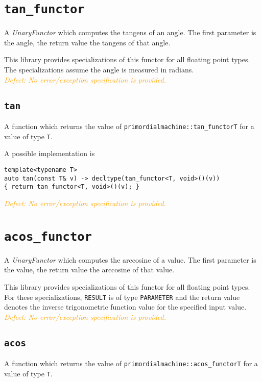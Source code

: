 \documentclass[oneside]{report}
\begin{document}
\section{\texttt{tan\_functor}}
A \textit{UnaryFunctor} which computes the
tangens
of an angle.
The first parameter is the angle, the return value the tangens of that angle.

\noindent{}This library provides specializations of this functor for all floating point types.
The specializations assume the angle is measured in radians.\\

\noindent{}\textcolor{orange}{\textit{Defect: No error/exception specification is provided.}}

\subsection{\texttt{tan}}
A function which returns the value of \texttt{primordialmachine::tan\_functor\textlangle T\textrangle}
for a value of type \texttt{T}.

\noindent{}A possible implementation is
\begin{verbatim}
template<typename T>
auto tan(const T& v) -> decltype(tan_functor<T, void>()(v))
{ return tan_functor<T, void>()(v); }
\end{verbatim}

\noindent{}\textcolor{orange}{\textit{Defect: No error/exception specification is provided.}}

\section{\texttt{acos\_functor}}
A \textit{UnaryFunctor} which computes the
arccosine
of a value.
The first parameter is the value, the return value the arccosine of that value.

\noindent{}This library provides specializations of this functor for all floating point types.
For these specializations, \texttt{RESULT} is of type \texttt{PARAMETER} and the return value
denotes the inverse trigonometric function value for the specified input value.\\

\noindent{}\textcolor{orange}{\textit{Defect: No error/exception specification is provided.}}

\subsection{\texttt{acos}}
A function which returns the value of \texttt{primordialmachine::acos\_functor\textlangle T\textrangle}
for a value of type \texttt{T}.
\end{document}
